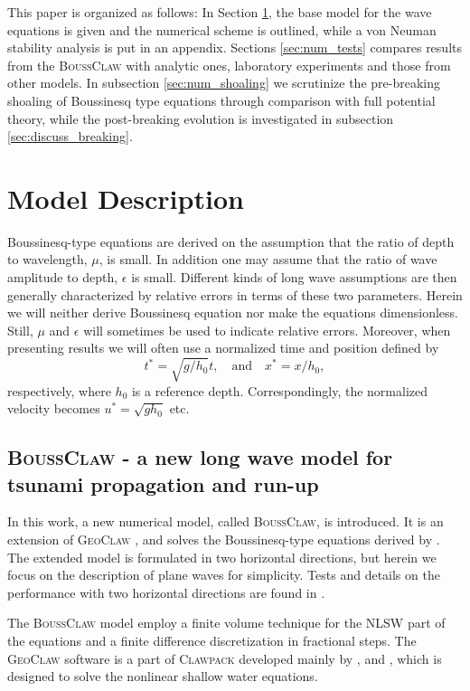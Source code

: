 \documentclass[review]{elsarticle}
\newcommand{\BoussClaw}{\textsc{BoussClaw} }
\newcommand{\BoussClawt}{\textsc{BoussClaw}}
\begin{document}
This paper is organized as follows: In Section \ref{sec:model}, the base model
for the wave equations is given and the numerical scheme is outlined,
while a von Neuman stability analysis is put in an appendix. 
Sections \ref{sec:num_tests} compares results from the \BoussClaw with analytic ones, laboratory experiments and those from other models. 
In subsection \ref{sec:num_shoaling} we scrutinize the pre-breaking shoaling of Boussinesq type equations through comparison with full potential theory, while the post-breaking evolution is investigated in  subsection  \ref{sec:discuss_breaking}.

\section{Model Description}
\label{sec:model}

Boussinesq-type equations are   derived 
on the assumption that the ratio of depth to wavelength, $\mu$,
is small. In addition one may assume that 
the ratio of wave amplitude to depth, $\epsilon$ is small.
Different kinds of long wave assumptions are then generally characterized
by relative errors in terms of these two parameters.
Herein we will neither derive Boussinesq equation nor make the equations 
dimensionless. Still, $\mu$ and $\epsilon$ will sometimes be used to indicate relative errors.
Moreover, when presenting results we will often use a normalized time and position defined by 
\begin{equation}
\label{eq:norm_coord}
t^*=\sqrt{g/h_0}t,\quad \mathrm{and}\quad x^*=x/h_0,
\end{equation}
 respectively, where $h_0$ is a reference depth. Correspondingly, the 
normalized velocity becomes $u^*=\sqrt{gh_0}$ etc.

\subsection{\BoussClaw - a new long wave model for tsunami propagation and run-up}
In this work, a new numerical model, 
called \BoussClawt, is introduced. 
It is an extension of \textsc{GeoClaw} \citep{clawpack},
and solves 
the Boussinesq-type equations derived by \citet{schaffer1995further}.
The extended model is formulated in two horizontal directions, 
but herein we focus on the description of plane waves for simplicity. 
Tests and details on the 
performance with two horizontal directions are found in \cite{kim2014finite}.

The \BoussClaw model
employ a  finite volume technique for the NLSW part of the equations and a finite 
difference discretization in 
fractional steps.
The \textsc{GeoClaw} software is 
a part of \textsc{Clawpack} \citep{clawpack}
developed mainly by
\citet{leveque1997wave}, \citet{george2008augmented}
and \citet{BergerGeorgeLeVequeMandli11},
which is designed to solve the nonlinear shallow water equations.
\end{document}
